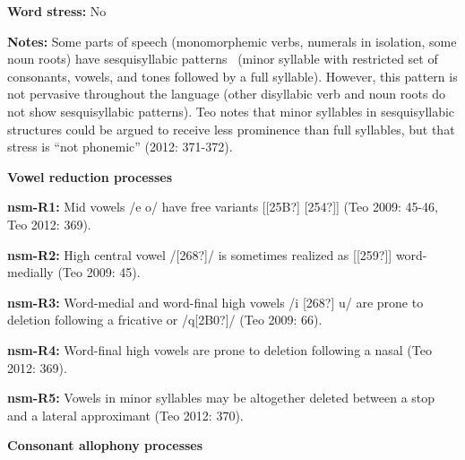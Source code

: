 \begin{styleBody}
\textbf{Word stress: }No
\end{styleBody}

\begin{styleBody}
\textbf{Notes: }Some parts of speech (monomorphemic verbs, numerals in isolation, some noun roots) have sesquisyllabic patterns \ (minor syllable with restricted set of consonants, vowels, and tones followed by a full syllable). However, this pattern is not pervasive throughout the language (other disyllabic verb and noun roots do not show sesquisyllabic patterns). Teo notes that minor syllables in sesquisyllabic structures could be argued to receive less prominence than full syllables, but that stress is “not phonemic” (2012: 371-372).
\end{styleBody}

\begin{styleBody}
\textbf{Vowel reduction processes}
\end{styleBody}

\begin{styleBody}
\textbf{nsm-R1: }Mid vowels /e o/ have free variants [[25B?] [254?]] (Teo 2009: 45-46, Teo 2012: 369).
\end{styleBody}

\begin{styleBody}
\textbf{nsm-R2: }High central vowel /[268?]/ is sometimes realized as [[259?]] word-medially (Teo 2009: 45).
\end{styleBody}

\begin{styleBody}
\textbf{nsm-R3: }Word-medial and word-final high vowels /i [268?] u/ are prone to deletion following a fricative or /q[2B0?]/ (Teo 2009: 66).
\end{styleBody}

\begin{styleBody}
\textbf{nsm-R4: }Word-final high vowels are prone to deletion following a nasal (Teo 2012: 369).
\end{styleBody}

\begin{styleBody}
\textbf{nsm-R5:} Vowels in minor syllables may be altogether deleted between a stop and a lateral approximant (Teo 2012: 370).
\end{styleBody}

\begin{styleBody}
\textbf{Consonant allophony processes}
\end{styleBody}

